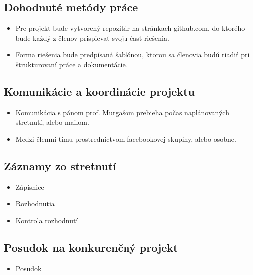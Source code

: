     \subsection{Dohodnuté metódy práce}
    	\begin{itemize}
    		\item Pre projekt bude vytvorený repozitár na stránkach github.com, do ktorého bude každý z členov prispievať svoju časť riešenia.
    		\item Forma riešenia bude predpísaná šablónou, ktorou sa členovia budú riadiť pri štrukturovaní práce a dokumentácie.
    	\end{itemize}
    
    \subsection{Komunikácie a koordinácie projektu}
    
    	\begin{itemize}
    		\item Komunikácia s pánom prof. Murgašom prebieha počas naplánovaných stretnutí, alebo mailom.
    		\item Medzi členmi tímu prostredníctvom facebookovej skupiny, alebo osobne. 
    	\end{itemize}
    
    \subsection{Záznamy zo stretnutí}
    \begin{itemize}
    	\item Zápisnice
    	\item Rozhodnutia 
    	\item Kontrola rozhodnutí
    \end{itemize}

    \subsection{Posudok na konkurenčný projekt}
    \begin{itemize}
    	\item Posudok
    \end{itemize}

